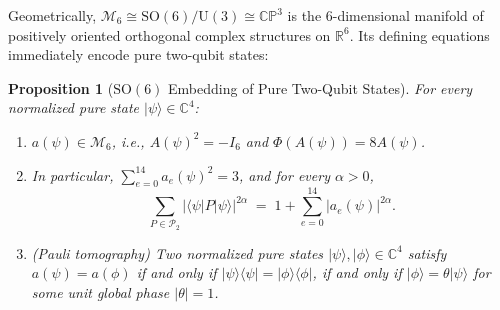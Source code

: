 \documentclass[11pt,a4paper]{article}
\theoremstyle{plain}
\newtheorem{proposition}[theorem]{Proposition}
\theoremstyle{definition}
\theoremstyle{remark}
\newcommand{\C}{\mathbb{C}}
\newcommand{\R}{\mathbb{R}}
\newcommand{\ket}[1]{\lvert #1 \rangle}
\newcommand{\ketbra}[2]{\lvert #1 \rangle\langle #2 \rvert}
\newcommand{\expval}[2]{\langle #1 \vert #2 \vert #1 \rangle}
\newcommand{\SO}{\mathrm{SO}}
\newcommand{\Pauli}{\mathcal{P}}
\newcommand{\Mman}{\mathcal{M}_6}
\begin{document}
Geometrically, $\Mman \cong \SO(6)/\mathrm{U}(3) \cong \C\mathbb{P}^3$ is the $6$-dimensional manifold of positively oriented orthogonal complex structures on $\R^6$. Its defining equations immediately encode pure two-qubit states:

\begin{proposition}[$\SO(6)$ Embedding of Pure Two-Qubit States]
\label{prop:so6-embed}
For every normalized pure state $\ket{\psi} \in \C^4$:
\begin{enumerate}[label=\textup{(\alph*)}, leftmargin=2em]
  \item $a(\psi) \in \Mman$, i.e., $A(\psi)^2 = -I_6$ and $\Phi(A(\psi)) = 8A(\psi)$.
  \item In particular, $\sum_{e=0}^{14} a_e(\psi)^2 = 3$, and for every $\alpha > 0$,
  \begin{equation}
    \sum_{P \in \Pauli_2} \lvert\expval{\psi}{P}\rvert^{2\alpha} \;=\; 1 + \sum_{e=0}^{14} \lvert a_e(\psi)\rvert^{2\alpha}.
  \end{equation}
  \item \emph{(Pauli tomography)} Two normalized pure states $\ket{\psi}, \ket{\phi} \in \C^4$ satisfy $a(\psi) = a(\phi)$ if and only if $\ketbra{\psi}{\psi} = \ketbra{\phi}{\phi}$, if and only if $\ket{\phi} = \theta\ket{\psi}$ for some unit global phase $\lvert\theta\rvert = 1$.
\end{enumerate}
\end{proposition}
\end{document}
